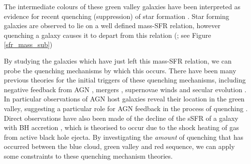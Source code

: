 \documentclass{mn2e}
\begin{document}
The intermediate colours of these green valley galaxies have been interpreted as evidence for recent quenching (suppression) of star formation \citep{Salim07}. Star forming galaxies are observed to lie on a well defined mass-SFR relation, however quenching a galaxy causes it to depart from this relation (\citealt{Noeske07, Peng}; see Figure \ref{sfr_mass_sub})

By studying the galaxies which  have just left this mass-SFR relation, we can probe the quenching mechanisms by which this occurs. There have been many previous theories for the initial triggers of these quenching mechanisms, including negative feedback from AGN \citep{Sch07}, mergers \citep{Darg10a}, supernovae winds \citep{MFB12} and secular evolution \citep{Masters10, Masters11}. In particular observations of AGN host galaxies reveal their location in the green valley, suggesting a particular role for AGN feedback in the process of quenching \citep{Nandra07, Hasinger08, Silverman08, Sch2014}. Direct observations have also been made of the decline of the sSFR of a galaxy with BH accretion \citep{Sch07, Wild07, Nandra07}, which is theorised to occur due to the shock heating of gas from active black hole ejecta. By investigating the \emph{amount} of quenching that has occurred between the blue cloud, green valley and red sequence, we can apply some constraints to these quenching mechanism theories. 
\end{document}
